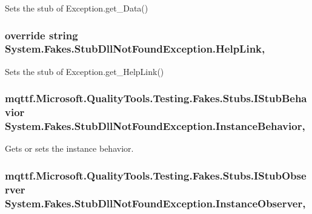 Sets the stub of Exception.\-get\-\_\-\-Data()

\hypertarget{class_system_1_1_fakes_1_1_stub_dll_not_found_exception_a14b8bf17b4d0a0ab52212d145e38c78d}{
\subsubsection[{Help\-Link}]{\setlength{\rightskip}{0pt plus 5cm}override string System.\-Fakes.\-Stub\-Dll\-Not\-Found\-Exception.\-Help\-Link\hspace{0.3cm}{\ttfamily [get]}, {\ttfamily [set]}}}\label{class_system_1_1_fakes_1_1_stub_dll_not_found_exception_a14b8bf17b4d0a0ab52212d145e38c78d}


Sets the stub of Exception.\-get\-\_\-\-Help\-Link()

\hypertarget{class_system_1_1_fakes_1_1_stub_dll_not_found_exception_a5d466583fc4f64d0f0cf660257180a7b}{
\subsubsection[{Instance\-Behavior}]{\setlength{\rightskip}{0pt plus 5cm}mqttf.\-Microsoft.\-Quality\-Tools.\-Testing.\-Fakes.\-Stubs.\-I\-Stub\-Behavior System.\-Fakes.\-Stub\-Dll\-Not\-Found\-Exception.\-Instance\-Behavior\hspace{0.3cm}{\ttfamily [get]}, {\ttfamily [set]}}}\label{class_system_1_1_fakes_1_1_stub_dll_not_found_exception_a5d466583fc4f64d0f0cf660257180a7b}


Gets or sets the instance behavior.

\hypertarget{class_system_1_1_fakes_1_1_stub_dll_not_found_exception_ae92f408dd706c71c9febdc0532a19af6}{
\subsubsection[{Instance\-Observer}]{\setlength{\rightskip}{0pt plus 5cm}mqttf.\-Microsoft.\-Quality\-Tools.\-Testing.\-Fakes.\-Stubs.\-I\-Stub\-Observer System.\-Fakes.\-Stub\-Dll\-Not\-Found\-Exception.\-Instance\-Observer\hspace{0.3cm}{\ttfamily [get]}, {\ttfamily [set]}}}\label{class_system_1_1_fakes_1_1_stub_dll_not_found_exception_ae92f408dd706c71c9febdc0532a19af6}


